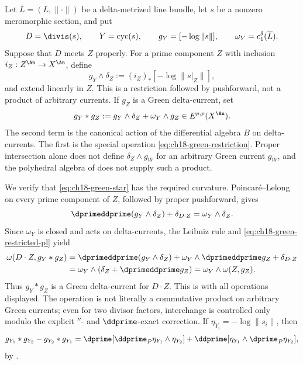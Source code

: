 Let $\overline L=(L,\|\cdot\|)$ be a delta-metrized line bundle, let $s$ be
a nonzero meromorphic section, and put
\[
 D=\divis(s),\qquad Y=\operatorname{cyc}(s),\qquad
 g_Y=[-\log\|s\|],\qquad \omega_Y=c_1^\delta(\overline L).
\]
Suppose that $D$ meets $Z$ properly.  For a prime component $Z$ with
inclusion $i_Z:Z^{\An}\to X^{\An}$, define
\begin{equation}
\label{eq:ch18-green-restriction}
       g_Y\wedge\delta_Z
       :=(i_Z)_*[-\log\|s|_Z\|],
\end{equation}
and extend linearly in $Z$.  This is a restriction followed by pushforward,
not a product of arbitrary currents.  If $g_Z$ is a Green delta-current, set
\begin{equation}
\label{eq:ch18-green-star}
             g_Y*g_Z:=g_Y\wedge\delta_Z+\omega_Y\wedge g_Z
             \in E^{p,p}(X^{\An}).
\end{equation}
The second term is the canonical action of the differential algebra $B$ on
delta-currents.  The first is the special operation
\eqref{eq:ch18-green-restriction}.  Proper intersection alone does not
define $\delta_Z\wedge g_W$ for an arbitrary Green current $g_W$, and the
polyhedral algebra of  does not supply such
a product.

We verify that \eqref{eq:ch18-green-star} has the required curvature.
Poincar\'e--Lelong on every prime component of $Z$, followed by proper
pushforward, gives
\begin{equation}
\label{eq:ch18-green-restricted-pl}
 \dprimeddprime(g_Y\wedge\delta_Z)+\delta_{D\cdot Z}
            =\omega_Y\wedge\delta_Z .
\end{equation}
Since $\omega_Y$ is closed and acts on delta-currents, the Leibniz rule and
\eqref{eq:ch18-green-restricted-pl} yield
\begin{align*}
 \omega(D\cdot Z,g_Y*g_Z)
 &=\dprimeddprime(g_Y\wedge\delta_Z)
    +\omega_Y\wedge\dprimeddprime g_Z+\delta_{D\cdot Z}\\
 &=\omega_Y\wedge(\delta_Z+\dprimeddprime g_Z)
  =\omega_Y\wedge\omega(Z,g_Z).
\end{align*}
Thus $g_Y*g_Z$ is a Green delta-current for $D\cdot Z$.  This is
\cite[Lemma~11.3 and Proposition~11.4]{GK17} with all operations displayed.
The operation is not literally a commutative product on arbitrary Green
currents; even for two divisor factors, interchange is controlled only
modulo the explicit $\dprime$- and $\ddprime$-exact correction.  If
$\eta_{Y_i}=-\log\|s_i\|$, then
\begin{equation}
\label{eq:ch18-green-commutator}
 g_{Y_1}*g_{Y_2}-g_{Y_2}*g_{Y_1}
 =\dprime[\ddprime_P\eta_{Y_1}\wedge\eta_{Y_2}]
  +\ddprime[\eta_{Y_1}\wedge\dprime_P\eta_{Y_2}],
\end{equation}
by \cite[Proposition~11.5]{GK17}.

